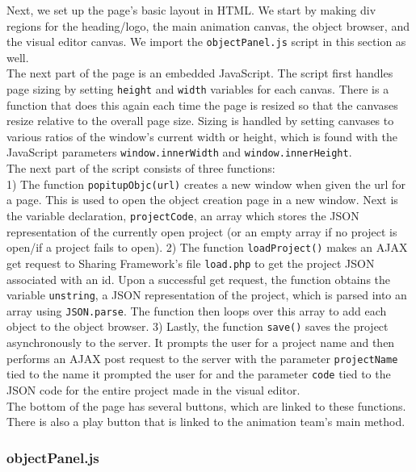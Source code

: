 \documentclass[12pt]{article}
\begin{document}
Next, we set up the page's basic layout in HTML. We start by making div regions for the heading/logo, the main animation canvas, the object browser, and the visual editor canvas. We import the \texttt{objectPanel.js} script in this section as well. \\

The next part of the page is an embedded JavaScript. The script first handles page sizing by setting \texttt{height} and \texttt{width} variables for each canvas. There is a function that does this again each time the page is resized so that the canvases resize relative to the overall page size. Sizing is handled by setting canvases to various ratios of the window's current width or height, which is found with the JavaScript parameters \texttt{window.innerWidth} and \texttt{window.innerHeight}. \\

The next part of the script consists of three functions: \\

1) The function \texttt{popitupObjc(url)} creates a new window when given the url for a page. This is used to open the object creation page in a new window. Next is the variable declaration, \texttt{projectCode}, an array which stores the JSON representation of the currently open project (or an empty array if no project is open/if a project fails to open). 2) The function \texttt{loadProject()} makes an AJAX get request to Sharing Framework's file \texttt{load.php} to get the project JSON associated with an id. Upon a successful get request, the function obtains the variable \texttt{unstring}, a JSON representation of the project, which is parsed into an array using \texttt{JSON.parse}. The function then loops over this array to add each object to the object browser. 3) Lastly, the function \texttt{save()} saves the project asynchronously to the server. It prompts the user for a project name and then performs an AJAX post request to the server with the parameter \texttt{projectName} tied to the name it prompted the user for and the parameter \texttt{code} tied to the JSON code for the entire project made in the visual editor. \\

The bottom of the page has several buttons, which are linked to these functions. There is also a play button that is linked to the animation team's main method. \\

\subsubsection{objectPanel.js}
\end{document}
